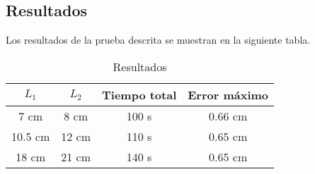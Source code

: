 \subsection{Resultados}

Los resultados de la prueba descrita se muestran en la siguiente tabla.

\begin{table}[ht]
	\centering
	\begin{tabular}{|c|c|c|c|}
		\hline
		\textbf{$L_1$} & \textbf{$L_2$} & \textbf{Tiempo total} & \textbf{Error máximo} \\
		\hline
		7 cm  & 8 cm  & 100 s & 0.66 cm \\
		10.5 cm & 12 cm & 110 s & 0.65 cm \\
		18 cm  & 21 cm & 140 s & 0.65 cm \\
		\hline
	\end{tabular}
	\caption{Resultados}
\end{table}